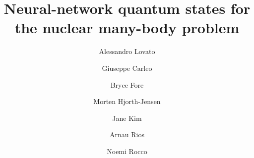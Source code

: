 	
	\begin{frontmatter}
		
        \title{Neural-network quantum states for the nuclear many-body problem}

		\author[argonne_phy,argonne_cps,trento,ific]{Alessandro Lovato }
        \address[argonne_phy]{Physics Division, Argonne National Laboratory, Argonne, Illinois 60439, USA}
        \address[argonne_cps]{Computational Science Division, Argonne National Laboratory, Argonne, Illinois 60439, USA}
        \address[trento]{INFN-TIFPA Trento Institute of Fundamental Physics and Applications, 38123 Trento, Italy. }
        \address[ific]{Instituto de Física Corpuscular (IFIC), Consejo Superior de Investigaciones Científicas (CSIC) and Universidad de Valencia
        E-46980 Paterna, Valencia, Spain}
		
		\author[epfl]{Giuseppe Carleo}  
        \address[epfl]{Institute of Physics, École Polytechnique Fédérale de Lausanne (EPFL), CH-1015 Lausanne, Switzerland}

        \author[argonne_phy]{Bryce Fore}

        \author[oslo]{Morten Hjorth-Jensen}
        \address[oslo]{Department of Physics and Center for Computing in Science Education, University of Oslo, N-0316 Oslo, Norway}

        \author[argonne_phy,ohio]{Jane Kim}
        \address[ohio]{Institute of Nuclear and Particle Physics and Department of Physics and Astronomy, Ohio University, Athens, OH, 45701, USA}
               
        \author[barcelona-fqa,barcelona-icc]{Arnau Rios}
        \address[barcelona-fqa]{Departament de Física Quàntica i Astrofísica, Universitat de Barcelona (UB), c. Martí i Franquès         1, E08028 Barcelona, Spain}
        \address[barcelona-icc]{Institut de Ciències del Cosmos, Universitat de Barcelona (UB), c. Martí i Franquès 1, E08028 Barcelona, Spain}
        
        \author[fermilab,ific]{Noemi Rocco}
        \address[fermilab]{Theoretical Physics Department Fermi National Accelerator Laboratory P.O. Box 500 Batavia Illinois 60510 USA}
		

\end{frontmatter}
